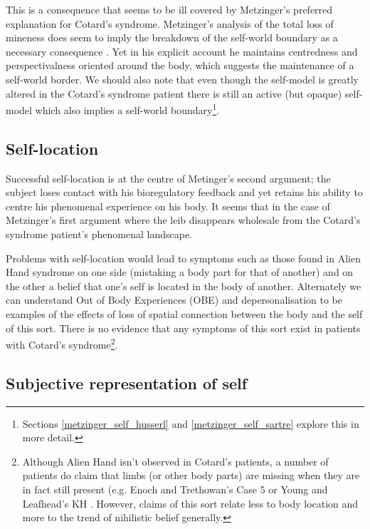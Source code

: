 This is a consequence that seems to be ill covered by Metzinger's preferred explanation for Cotard's syndrome. Metzinger's analysis of the total loss of mineness does seem to imply the breakdown of the self-world boundary as a necessary consequence \cite[p. 307]{metzinger2003}. Yet in his explicit account he maintains centredness and perspectivalness \cite[p. 460]{metzinger2003} oriented around the body, which suggests the maintenance of a self-world border. We should also note that even though the self-model is greatly altered in the Cotard's syndrome patient there is still an active (but opaque) self-model which also implies a self-world boundary\footnote{Sections \ref{metzinger_self_husserl} and \ref{metzinger_self_sartre} explore this in more detail.}.

\subsection{Self-location}

Successful self-location is at the centre of Metinger's second argument; the subject loses contact with his bioregulatory feedback and yet retains his ability to centre his phenomenal experience on his body. It seems that in the case of Metzinger's first argument where the leib disappears wholesale from the Cotard's syndrome patient's phenomenal landscape.

Problems with self-location would lead to symptoms such as those found in Alien Hand syndrome on one side (mistaking a body part for that of another) and on the other a belief that one's self is located in the body of another. Alternately we can understand Out of Body Experiences (OBE) and depersonalisation to be examples of the effects of loss of spatial connection between the body and the self of this sort. There is no evidence that any symptoms of this sort exist in patients with Cotard's syndrome\footnote{Although Alien Hand isn't observed in Cotard's patients, a number of patients do claim that limbs (or other body parts) are missing when they are in fact still present (e.g. Enoch and Trethowan's Case 5 \cite[p. 172]{enoch1991} or Young and Leafhead's KH \cite[p. 160]{young1995}. However, claims of this sort relate less to body location and more to the trend of nihilistic belief generally.}.

\subsection{Subjective representation of self}

